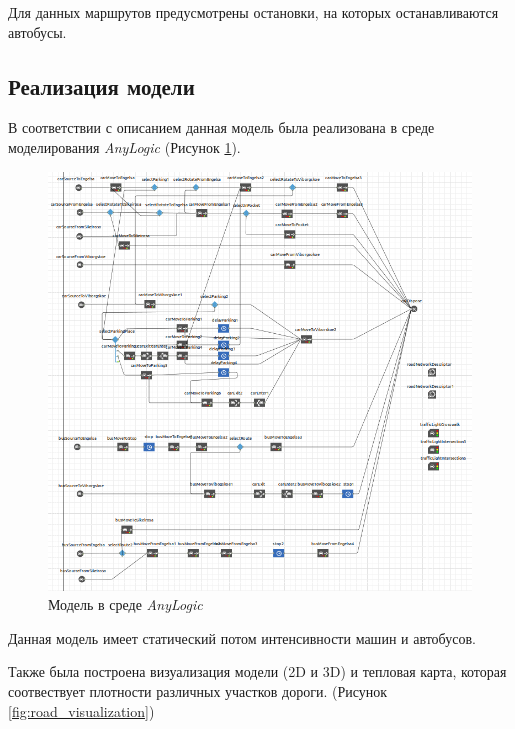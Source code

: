 \documentclass[14pt,fleqn]{extarticle}
\begin{document}
	Для данных маршрутов предусмотрены остановки, на которых останавливаются автобусы.
	
	\newpage
	
	\subsection*{Реализация модели}

	В соответствии с описанием данная модель была реализована в среде моделирования \textit{AnyLogic} (Рисунок \ref{fig:road_anylogic_model}).
	
	\begin{figure}[h]
		\centering \includegraphics[scale=0.4]{road_anylogic_model}
		\caption{Модель в среде \textit{AnyLogic}}
		\label{fig:road_anylogic_model}
	\end{figure}
	
	Данная модель имеет статический потом интенсивности машин и автобусов.\\
	
	\newpage
	
	Также была построена визуализация модели (2D и 3D) и тепловая карта, которая соотвествует плотности различных участков дороги. (Рисунок \ref{fig:road_visualization})
	
\end{document}
